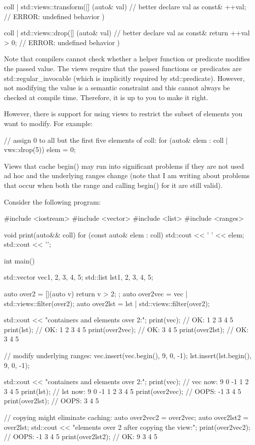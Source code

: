 \begin{cpp}
coll | std::views::transform([] (auto& val) { // better declare val as const&
	++val; // ERROR: undefined behavior
})

coll | std::views::drop([] (auto& val) { // better declare val as const&
	return ++val > 0; // ERROR: undefined behavior
})
\end{cpp}

Note that compilers cannot check whether a helper function or predicate modifies the passed value. The views require that the passed functions or predicates are std::regular\_invocable (which is implicitly required by std::predicate). However, not modifying the value is a semantic constraint and this cannot always be checked at compile time. Therefore, it is up to you to make it right.

However, there is support for using views to restrict the subset of elements you want to modify. For example:

\begin{cpp}
// assign 0 to all but the first five elements of coll:
for (auto& elem : coll | vws::drop(5)) {
	elem = 0;
}
\end{cpp}


Views that cache begin() may run into significant problems if they are not used ad hoc and the underlying ranges change (note that I am writing about problems that occur when both the range and calling begin() for it are still valid).

Consider the following program:


\begin{cpp}
#include <iostream>
#include <vector>
#include <list>
#include <ranges>

void print(auto&& coll)
{
	for (const auto& elem : coll) {
		std::cout << ' ' << elem;
	}
	std::cout << '\n';
}

int main()
{
	std::vector vec{1, 2, 3, 4, 5};
	std::list lst{1, 2, 3, 4, 5};
	
	auto over2 = [](auto v) { return v > 2; };
	auto over2vec = vec | std::views::filter(over2);
	auto over2lst = lst | std::views::filter(over2);
	
	std::cout << "containers and elements over 2:\n";
	print(vec); // OK: 1 2 3 4 5
	print(lst); // OK: 1 2 3 4 5
	print(over2vec); // OK: 3 4 5
	print(over2lst); // OK: 3 4 5
	
	// modify underlying ranges:
	vec.insert(vec.begin(), {9, 0, -1});
	lst.insert(lst.begin(), {9, 0, -1});
	
	std::cout << "containers and elements over 2:\n";
	print(vec); // vec now: 9 0 -1 1 2 3 4 5
	print(lst); // lst now: 9 0 -1 1 2 3 4 5
	print(over2vec); // OOPS: -1 3 4 5
	print(over2lst); // OOPS: 3 4 5
	
	// copying might eliminate caching:
	auto over2vec2 = over2vec;
	auto over2lst2 = over2lst;
	std::cout << "elements over 2 after copying the view:\n";
	print(over2vec2); // OOPS: -1 3 4 5
	print(over2lst2); // OK: 9 3 4 5
	}
\end{cpp}


